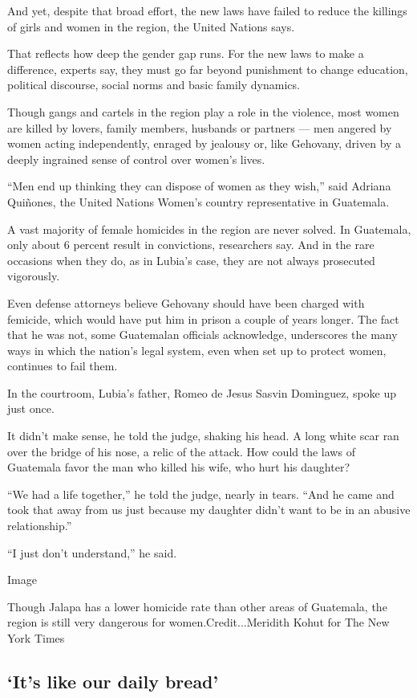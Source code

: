 And yet, despite that broad effort, the new laws have failed to reduce
the killings of girls and women in the region, the United Nations says.

That reflects how deep the gender gap runs. For the new laws to make a
difference, experts say, they must go far beyond punishment to change
education, political discourse, social norms and basic family dynamics.

Though gangs and cartels in the region play a role in the violence, most
women are killed by lovers, family members, husbands or partners --- men
angered by women acting independently, enraged by jealousy or, like
Gehovany, driven by a deeply ingrained sense of control over women's
lives.

``Men end up thinking they can dispose of women as they wish,'' said
Adriana Quiñones, the United Nations Women's country representative in
Guatemala.

A vast majority of female homicides in the region are never solved. In
Guatemala, only about 6 percent result in convictions, researchers say.
And in the rare occasions when they do, as in Lubia's case, they are not
always prosecuted vigorously.

Even defense attorneys believe Gehovany should have been charged with
femicide, which would have put him in prison a couple of years longer.
The fact that he was not, some Guatemalan officials acknowledge,
underscores the many ways in which the nation's legal system, even when
set up to protect women, continues to fail them.

In the courtroom, Lubia's father, Romeo de Jesus Sasvin Dominguez, spoke
up just once.

It didn't make sense, he told the judge, shaking his head. A long white
scar ran over the bridge of his nose, a relic of the attack. How could
the laws of Guatemala favor the man who killed his wife, who hurt his
daughter?

``We had a life together,'' he told the judge, nearly in tears. ``And he
came and took that away from us just because my daughter didn't want to
be in an abusive relationship.''

``I just don't understand,'' he said.

Image

Though Jalapa has a lower homicide rate than other areas of Guatemala,
the region is still very dangerous for women.Credit...Meridith Kohut for
The New York Times

\hypertarget{its-like-our-daily-bread}{%
\subsection{`It's like our daily
bread'}\label{its-like-our-daily-bread}}


